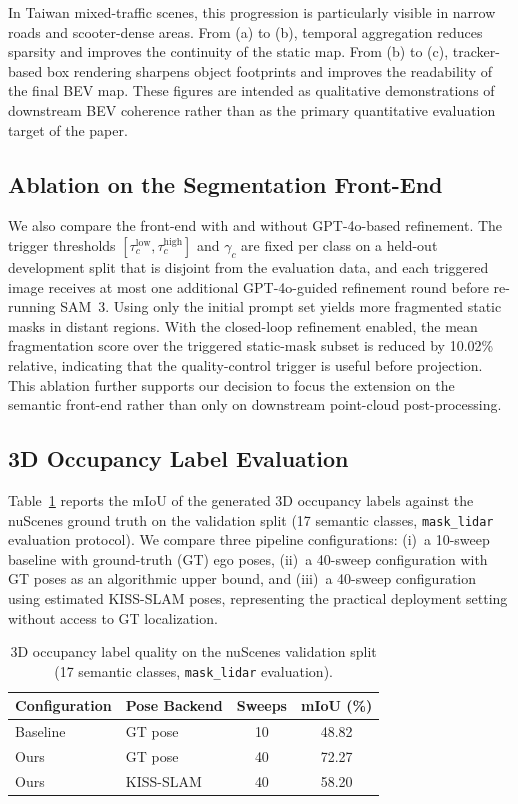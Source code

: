 \documentclass[conference]{IEEEtran}
\begin{document}
In Taiwan mixed-traffic scenes, this progression is particularly visible in narrow roads and scooter-dense areas. From (a) to (b), temporal aggregation reduces sparsity and improves the continuity of the static map. From (b) to (c), tracker-based box rendering sharpens object footprints and improves the readability of the final BEV map. These figures are intended as qualitative demonstrations of downstream BEV coherence rather than as the primary quantitative evaluation target of the paper.

\subsection{Ablation on the Segmentation Front-End}
We also compare the front-end with and without GPT-4o-based refinement. The trigger thresholds $[\tau_c^{\mathrm{low}}, \tau_c^{\mathrm{high}}]$ and $\gamma_c$ are fixed per class on a held-out development split that is disjoint from the evaluation data, and each triggered image receives at most one additional GPT-4o-guided refinement round before re-running SAM~3. Using only the initial prompt set yields more fragmented static masks in distant regions. With the closed-loop refinement enabled, the mean fragmentation score over the triggered static-mask subset is reduced by 10.02\% relative, indicating that the quality-control trigger is useful before projection. This ablation further supports our decision to focus the extension on the semantic front-end rather than only on downstream point-cloud post-processing.

\subsection{3D Occupancy Label Evaluation}
Table~\ref{tab:occupancy} reports the mIoU of the generated 3D occupancy labels against the nuScenes ground truth on the validation split (17 semantic classes, \texttt{mask\_lidar} evaluation protocol). We compare three pipeline configurations: (i)~a 10-sweep baseline with ground-truth (GT) ego poses, (ii)~a 40-sweep configuration with GT poses as an algorithmic upper bound, and (iii)~a 40-sweep configuration using estimated KISS-SLAM poses, representing the practical deployment setting without access to GT localization.

\begin{table}[t]
  \caption{3D occupancy label quality on the nuScenes validation split (17 semantic classes, \texttt{mask\_lidar} evaluation).}
  \label{tab:occupancy}
  \centering
  \begin{tabular}{llcc}
    \toprule
    Configuration & Pose Backend & Sweeps & mIoU (\%) \\
    \midrule
    Baseline & GT pose      & 10 & 48.82 \\
    Ours     & GT pose      & 40 & 72.27 \\
    Ours     & KISS-SLAM    & 40 & 58.20 \\
    \bottomrule
  \end{tabular}
\end{table}
\end{document}
